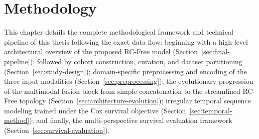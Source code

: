 \chapter{Methodology}
\label{chap:method}

This chapter details the complete methodological framework and technical pipeline of this thesis following the exact data flow: beginning with a high-level architectural overview of the proposed RC-Free model (Section~\ref{sec:final-pipeline}); followed by cohort construction, curation, and dataset partitioning (Section~\ref{sec:study-design}); domain-specific preprocessing and encoding of the three input modalities (Section~\ref{sec:preprocessing}); the evolutionary progression of the multimodal fusion block from simple concatenation to the streamlined RC-Free topology (Section~\ref{sec:architecture-evolution}); irregular temporal sequence modeling trained under the Cox survival objective (Section~\ref{sec:temporal-method}); and finally, the multi-perspective survival evaluation framework (Section~\ref{sec:survival-evaluation}).

